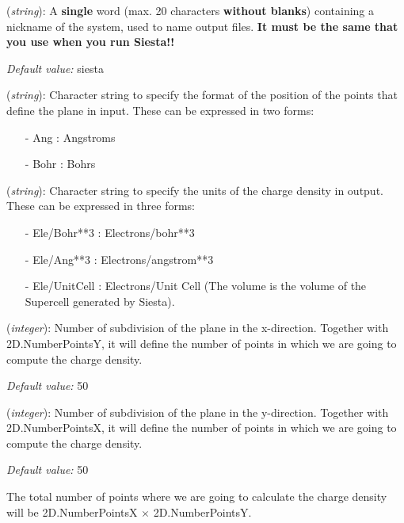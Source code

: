 \begin{description}
\itemsep 10pt
\parsep 0pt

\item[{\bf SystemLabel}] ({\it string}): 
A {\bf single} word (max. 20 characters {\bf without blanks})
containing a nickname of the system, used to name output files. 
{\bf It must be the same that you use when you run {\sc Siesta}!!}

{\it Default value:} siesta

\item[{\bf 2D.CoorUnits}] ({\it string}): 
Character string to specify the format of the position of the points that
define the plane in input.
These can be expressed in two forms:

\begin{itemize}
\item[-] Ang        : Angstroms 
\item[-] Bohr       : Bohrs
\end{itemize}

\item[{\bf 2D.DensityUnits}] ({\it string}): 
Character string to specify the units of the charge density in output. 
These can be expressed in three forms:

\begin{itemize}
\item[-] Ele/Bohr**3      : Electrons/bohr**3
\item[-] Ele/Ang**3       : Electrons/angstrom**3
\item[-] Ele/UnitCell     : Electrons/Unit Cell (The volume is the volume
                            of the Supercell generated by {\sc Siesta}).
\end{itemize}


\item[{\bf 2D.NumberPointsX}] ({\it integer}):
 Number of subdivision of the plane in the x-direction. Together
 with 2D.NumberPointsY, it will define the 
 number of points in which we are going to compute the charge density.

{\it Default value:} 50

\item[{\bf 2D.NumberPointsY}] ({\it integer}):
 Number of subdivision of the plane in the y-direction. Together
 with 2D.NumberPointsX, it will define the 
 number of points in which we are going to compute the charge density.

{\it Default value:} 50

 The total number of points where we are going to calculate the charge density
 will be 2D.NumberPointsX $\times$ 2D.NumberPointsY.


\end{description}
